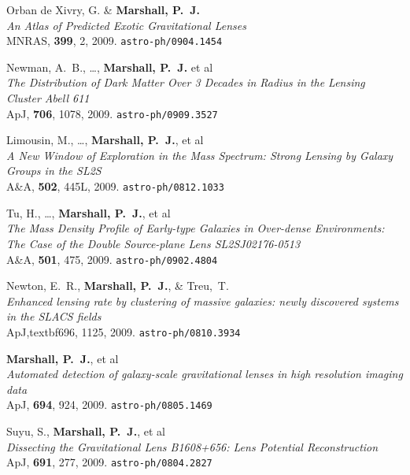 \begin{revnumerate}
\item{Orban de Xivry, G. \& \textbf{{Marshall}, P.~J.}\\
\textit{An Atlas of Predicted Exotic Gravitational Lenses}\\
MNRAS, \textbf{399}, 2, 2009.
\texttt{astro-ph/0904.1454}
}

\item{{Newman}, A.~B., \dots, \textbf{{Marshall}, P.~J.} et al\\
\textit{The Distribution of Dark Matter Over 3 Decades in Radius in the
Lensing Cluster Abell 611}\\
ApJ, \textbf{706}, 1078, 2009.
\texttt{astro-ph/0909.3527}
}

\item{{Limousin}, M., \ldots, \textbf{{Marshall}, P.~J.}, et al\\
\textit{A New Window of Exploration in the Mass Spectrum: Strong Lensing by Galaxy Groups in the SL2S}\\
A\&A, \textbf{502}, 445L, 2009.
\texttt{astro-ph/0812.1033}
}

\item{{Tu}, H., \ldots, \textbf{{Marshall}, P.~J.}, et al\\
\textit{The Mass Density Profile of Early-type Galaxies in Over-dense
Environments: The Case of the Double Source-plane Lens SL2SJ02176-0513}\\
A\&A, \textbf{501}, 475, 2009.
\texttt{astro-ph/0902.4804}
}

\item{{Newton}, E.~R., \textbf{{Marshall}, P.~J.}, \& {Treu},~T.\\
\textit{Enhanced lensing rate by clustering of massive galaxies: newly discovered systems in the SLACS fields}\\
ApJ,textbf{696}, 1125, 2009.
\texttt{astro-ph/0810.3934}
}

\item{\textbf{{Marshall}, P.~J.}, et al\\
\textit{Automated detection of galaxy-scale gravitational lenses in high resolution imaging data}\\
ApJ, \textbf{694}, 924, 2009.
\texttt{astro-ph/0805.1469}
}

\item{Suyu, S., \textbf{{Marshall}, P.~J.}, et al\\
\textit{Dissecting the Gravitational Lens B1608+656: Lens Potential Reconstruction}\\
ApJ, \textbf{691}, 277, 2009.
\texttt{astro-ph/0804.2827}
}


\end{revnumerate}
